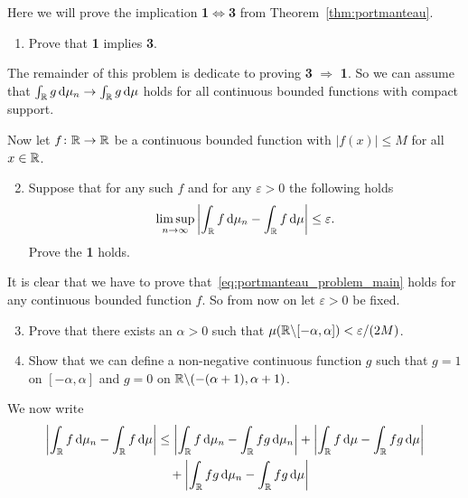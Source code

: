 \begin{problem}\label{prb:portmanteau}
Here we will prove the implication \textbf{1$\iff$3} from Theorem~\ref{thm:portmanteau}. 

\begin{enumerate}[label={(\alph*)}]
\item Prove that \textbf{1} implies \textbf{3}.
\end{enumerate}

The remainder of this problem is dedicate to proving \textbf{3} $\Rightarrow$ \textbf{1}. So we can assume that $\int_{\mathbb R} g \, \mathrm{d} \mu_n \to \int_{\mathbb R} g \, \mathrm{d} \mu$ holds for all continuous bounded functions with compact support.

Now let $f\colon \mathbb R \to \mathbb R$ be a continuous bounded function with $|f(x)| \le M$ for all $x \in \mathbb R$.
\begin{enumerate}[label={(\alph*)}]
\setcounter{enumi}{1}
\item Suppose that for any such $f$ and for any $\varepsilon > 0$ the following holds
\begin{equation}\label{eq:portmanteau_problem_main}
	\limsup_{n \to \infty} \left|\int_{\mathbb R} f \, \mathrm{d} \mu_n - \int_{\mathbb R} f \, \mathrm{d} \mu\right| \le \varepsilon.
\end{equation}
Prove the \textbf{1} holds.
\end{enumerate}

It is clear that we have to prove that~\eqref{eq:portmanteau_problem_main} holds for any continuous bounded function $f$. So from now on let $\varepsilon > 0$ be fixed.
\begin{enumerate}[label={(\alph*)}]
\setcounter{enumi}{2}
\item Prove that there exists an $\alpha > 0$ such that $\mu(\mathbb R \backslash [-\alpha, \alpha]) < \varepsilon/(2M)$.
\item Show that we can define a non-negative continuous function $g$ such that $g = 1$ on $[-\alpha, \alpha]$ and $g = 0$ on $\mathbb R \backslash (-(\alpha+1),\alpha+1)$.
\end{enumerate}

We now write 
\begin{align*}
	\left|\int_{\mathbb R} f \, \mathrm{d} \mu_n - \int_{\mathbb R} f \, \mathrm{d} \mu\right| &\le \left|\int_{\mathbb R} f \, \mathrm{d} \mu_n - \int_{\mathbb R} fg \, \mathrm{d} \mu_n\right| + \left|\int_{\mathbb R} f \, \mathrm{d} \mu - \int_{\mathbb R} fg \, \mathrm{d} \mu\right|\\ &\hspace{10pt}+ \left|\int_{\mathbb R} fg \, \mathrm{d} \mu_n - \int_{\mathbb R} fg \, \mathrm{d} \mu\right|
\end{align*}


\end{problem}
